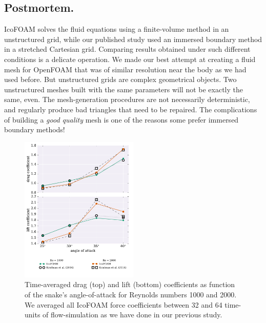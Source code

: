 \documentclass[9pt,twocolumn,twoside]{article}
\begin{document}
\subsection*{Postmortem.} 
IcoFOAM solves the fluid equations using a finite-volume method in an unstructured grid, while our published study used an immersed boundary method in a stretched Cartesian grid. 
Comparing results obtained under such different conditions is a delicate operation. 
We made our best attempt at creating a fluid mesh for OpenFOAM that was of similar resolution near the body as we had used before. 
But unstructured grids are complex geometrical objects. 
Two unstructured meshes built with the same parameters will not be exactly the same, even. 
The mesh-generation procedures are not necessarily deterministic, and regularly produce bad triangles that need to be repaired. 
The complications of building a \textit{good quality} mesh is one of the reasons some prefer immersed boundary methods!



\begin{figure}[t]
\centering
\includegraphics[width=0.5\textwidth]{./figures/openfoam/openfoam_forceCoefficientsVsAoA.pdf}
\caption{
Time-averaged drag (top) and lift (bottom) coefficients as function of the snake's angle-of-attack for Reynolds numbers 1000 and 2000.
We averaged all IcoFOAM force coefficients between 32 and 64 time-units of flow-simulation as we have done in our previous study.
}
\label{figure3}
\end{figure}
\end{document}
